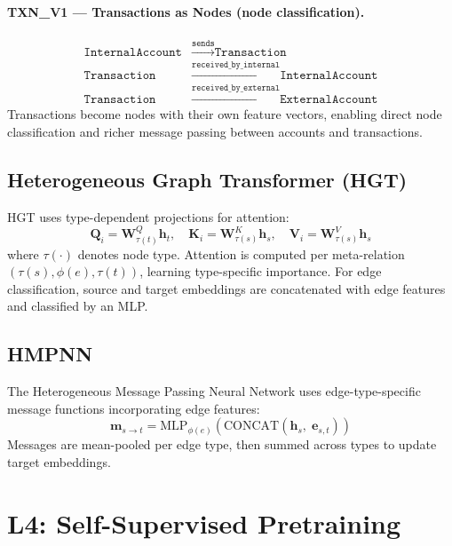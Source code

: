 \paragraph{TXN\_V1 — Transactions as Nodes (node classification).}
\begin{align*}
  \texttt{InternalAccount} &\xrightarrow{\texttt{sends}} \texttt{Transaction} \\
  \texttt{Transaction} &\xrightarrow{\texttt{received\_by\_internal}} \texttt{InternalAccount} \\
  \texttt{Transaction} &\xrightarrow{\texttt{received\_by\_external}} \texttt{ExternalAccount}
\end{align*}
Transactions become nodes with their own feature vectors, enabling direct node classification and richer message passing between accounts and transactions.

\subsection{Heterogeneous Graph Transformer (HGT)}

HGT \citep{hu2020hgt} uses type-dependent projections for attention:
\begin{equation}
  \mathbf{Q}_i = \mathbf{W}^Q_{\tau(t)} \mathbf{h}_t, \quad
  \mathbf{K}_i = \mathbf{W}^K_{\tau(s)} \mathbf{h}_s, \quad
  \mathbf{V}_i = \mathbf{W}^V_{\tau(s)} \mathbf{h}_s
\end{equation}
where $\tau(\cdot)$ denotes node type. Attention is computed per meta-relation $(\tau(s), \phi(e), \tau(t))$, learning type-specific importance. For edge classification, source and target embeddings are concatenated with edge features and classified by an MLP.

\subsection{HMPNN}

The Heterogeneous Message Passing Neural Network \citep{johannessen2023hmpnn} uses edge-type-specific message functions incorporating edge features:
\begin{equation}
  \mathbf{m}_{s \to t} = \mathrm{MLP}_{\phi(e)}\!\left(\mathrm{CONCAT}\!\left(\mathbf{h}_s,\; \mathbf{e}_{s,t}\right)\right)
\end{equation}
Messages are mean-pooled per edge type, then summed across types to update target embeddings.

\section{L4: Self-Supervised Pretraining}
\label{sec:l4}

